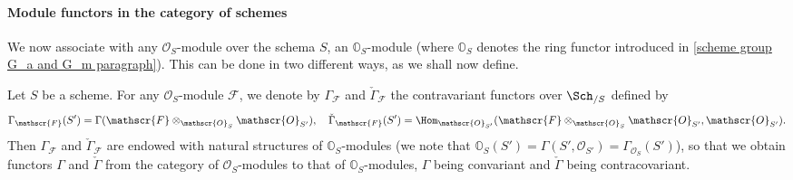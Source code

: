 \paragraph{Module functors in the category of schemes}
We now associate with any $\mathscr{O}_S$-module over the schema $S$, an $\mathbb{O}_S$-module (where $\mathbb{O}_S$ denotes the ring functor introduced in \ref{scheme group G_a and G_m paragraph}). This can be done in two different ways, as we shall now define.
\begin{definition}
Let $S$ be a scheme. For any $\mathscr{O}_S$-module $\mathscr{F}$, we denote by $\Gamma_\mathscr{F}$ and $\check{\Gamma}_\mathscr{F}$ the contravariant functors over $\Sch_{/S}$ defined by
\[\Gamma_\mathscr{F}(S')=\Gamma(\mathscr{F}\otimes_{\mathscr{O}_{S}}\mathscr{O}_{S'}),\quad \check{\Gamma}_\mathscr{F}(S')=\Hom_{\mathscr{O}_{S'}}(\mathscr{F}\otimes_{\mathscr{O}_{S}}\mathscr{O}_{S'},\mathscr{O}_{S'}).\]
Then $\Gamma_\mathscr{F}$ and $\check{\Gamma}_\mathscr{F}$ are endowed with natural structures of $\mathbb{O}_S$-modules (we note that $\mathbb{O}_S(S')=\Gamma(S',\mathscr{O}_{S'})=\Gamma_{\mathscr{O}_S}(S')$), so that we obtain functors $\Gamma$ and $\check{\Gamma}$ from the category of $\mathscr{O}_S$-modules to that of $\mathbb{O}_S$-modules, $\Gamma$ being convariant and $\check{\Gamma}$ being contracovariant.
\end{definition}

